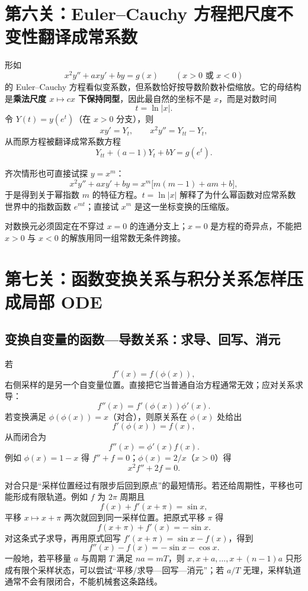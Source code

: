\documentclass[11pt,a4paper,fontset=fandol]{ctexart}
\begin{document}
\section{第六关：Euler--Cauchy 方程把尺度不变性翻译成常系数}

形如
\[
x^2y''+axy'+by=g(x)\qquad(x>0\text{ 或 }x<0)
\]
的 Euler--Cauchy 方程看似变系数，但系数恰好按导数阶数补偿缩放。它的母结构是\textbf{乘法尺度 $x\mapsto cx$ 下保持同型}，因此最自然的坐标不是 $x$，而是对数时间
\[
t=\ln\lvert x\rvert.
\]
令 $Y(t)=y(e^t)$（在 $x>0$ 分支），则
\[
xy'=Y_t,
\qquad
x^2y''=Y_{tt}-Y_t,
\]
从而原方程被翻译成常系数方程
\[
Y_{tt}+(a-1)Y_t+bY=g(e^t).
\]

齐次情形也可直接试探 $y=x^m$：
\[
x^2y''+axy'+by
=x^m\bigl[m(m-1)+am+b\bigr],
\]
于是得到关于幂指数 $m$ 的特征方程。$t=\ln\lvert x\rvert$ 解释了为什么幂函数对应常系数世界中的指数函数 $e^{mt}$；直接试 $x^m$ 是这一坐标变换的压缩版。

\begin{tcolorbox}[title=Euler--Cauchy 的资格边界]
对数换元必须固定在不穿过 $x=0$ 的连通分支上；$x=0$ 是方程的奇异点，不能把 $x>0$ 与 $x<0$ 的解族用同一组常数无条件跨接。
\end{tcolorbox}

\section{第七关：函数变换关系与积分关系怎样压成局部 ODE}

\subsection{变换自变量的函数—导数关系：求导、回写、消元}

若
\[
f'(x)=f(\phi(x)),
\]
右侧采样的是另一个自变量位置。直接把它当普通自治方程通常无效；应对关系求导：
\[
f''(x)=f'(\phi(x))\phi'(x).
\]
若变换满足 $\phi(\phi(x))=x$（对合），则原关系在 $\phi(x)$ 处给出
\[
f'(\phi(x))=f(x),
\]
从而闭合为
\[
\boxed{f''(x)=\phi'(x)f(x)}.
\]
例如 $\phi(x)=1-x$ 得 $f''+f=0$；$\phi(x)=2/x$（$x>0$）得
\[
x^2f''+2f=0.
\]

对合只是“采样位置经过有限步后回到原点”的最短情形。若还给周期性，平移也可能形成有限轨道。例如 $f$ 为 $2\pi$ 周期且
\[
f(x)+f'(x+\pi)=\sin x,
\]
平移 $x\mapsto x+\pi$ 两次就回到同一采样位置。把原式平移 $\pi$ 得
\[
f(x+\pi)+f'(x)=-\sin x.
\]
对这条式子求导，再用原式回写 $f'(x+\pi)=\sin x-f(x)$，得到
\[
\boxed{f''(x)-f(x)=-\sin x-\cos x}.
\]
一般地，若平移量 $a$ 与周期 $T$ 满足 $na=mT$，则 $x,x+a,\ldots,x+(n-1)a$ 只形成有限个采样状态，可以尝试“平移/求导—回写—消元”；若 $a/T$ 无理，采样轨道通常不会有限闭合，不能机械套这条路线。
\end{document}

